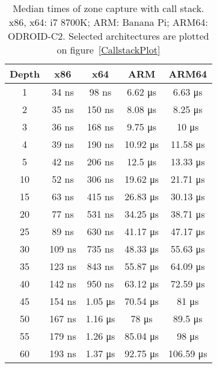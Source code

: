 \documentclass[hidelinks,titlepage,a4paper,twoside]{article}
\begin{document}
\begin{table}[h]
\centering
\begin{tabular}[h]{c|c|c|c|c}
\textbf{Depth} & \textbf{x86} & \textbf{x64} & \textbf{ARM} & \textbf{ARM64} \\ \hline
1 & 34 \si{\nano\second} & 98 \si{\nano\second} & 6.62 \si{\micro\second} & 6.63 \si{\micro\second} \\
2 & 35 \si{\nano\second} & 150 \si{\nano\second} & 8.08 \si{\micro\second} & 8.25 \si{\micro\second} \\
3 & 36 \si{\nano\second} & 168 \si{\nano\second} & 9.75 \si{\micro\second} & 10 \si{\micro\second} \\
4 & 39 \si{\nano\second} & 190 \si{\nano\second} & 10.92 \si{\micro\second} & 11.58 \si{\micro\second} \\
5 & 42 \si{\nano\second} & 206 \si{\nano\second} & 12.5 \si{\micro\second} & 13.33 \si{\micro\second} \\
10 & 52 \si{\nano\second} & 306 \si{\nano\second} & 19.62 \si{\micro\second} & 21.71 \si{\micro\second} \\
15 & 63 \si{\nano\second} & 415 \si{\nano\second} & 26.83 \si{\micro\second} & 30.13 \si{\micro\second} \\
20 & 77 \si{\nano\second} & 531 \si{\nano\second} & 34.25 \si{\micro\second} & 38.71 \si{\micro\second} \\
25 & 89 \si{\nano\second} & 630 \si{\nano\second} & 41.17 \si{\micro\second} & 47.17 \si{\micro\second} \\
30 & 109 \si{\nano\second} & 735 \si{\nano\second} & 48.33 \si{\micro\second} & 55.63 \si{\micro\second} \\
35 & 123 \si{\nano\second} & 843 \si{\nano\second} & 55.87 \si{\micro\second} & 64.09 \si{\micro\second} \\
40 & 142 \si{\nano\second} & 950 \si{\nano\second} & 63.12 \si{\micro\second} & 72.59 \si{\micro\second} \\
45 & 154 \si{\nano\second} & 1.05 \si{\micro\second} & 70.54 \si{\micro\second} & 81 \si{\micro\second} \\
50 & 167 \si{\nano\second} & 1.16 \si{\micro\second} & 78 \si{\micro\second} & 89.5 \si{\micro\second} \\
55 & 179 \si{\nano\second} & 1.26 \si{\micro\second} & 85.04 \si{\micro\second} & 98 \si{\micro\second} \\
60 & 193 \si{\nano\second} & 1.37 \si{\micro\second} & 92.75 \si{\micro\second} & 106.59 \si{\micro\second}
\end{tabular}
\caption{Median times of zone capture with call stack. x86, x64: i7 8700K; ARM: Banana Pi; ARM64: ODROID-C2. Selected architectures are plotted on figure~\ref{CallstackPlot}}
\label{CallstackTimes}
\end{table}
\end{document}
